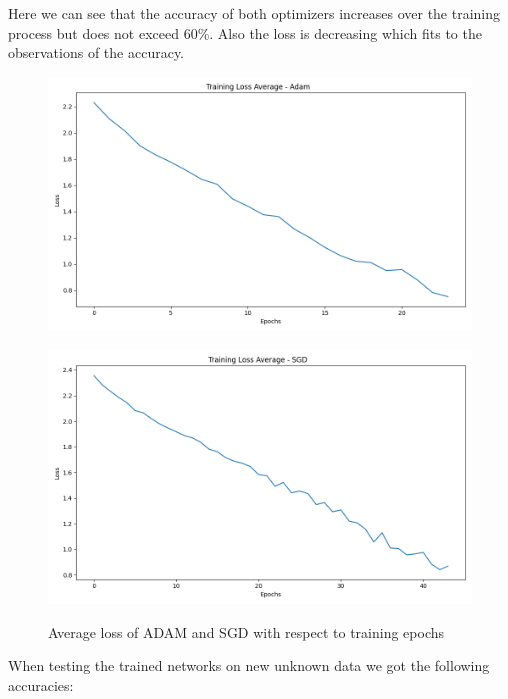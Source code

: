 \documentclass{tubaf-article}
\begin{document}
	Here we can see that the accuracy of both optimizers increases over the training process but does not exceed 60\%. Also the loss is decreasing which fits to the observations of the accuracy.

	\begin{figure}[h!]
		\centering
		\begin{minipage}{0.45\textwidth}
			\centering
			\includegraphics[width=\linewidth]{training_loss_Adam_avg.png}
			\label{fig:bild1}
		\end{minipage} \hfill
		\begin{minipage}{0.45\textwidth}
			\centering
			\includegraphics[width=\linewidth]{training_loss_sgd_avg.png}
			\label{fig:bild2}
		\end{minipage}
		\caption{Average loss of ADAM and SGD with respect to training epochs}
		\label{fig:zwei_bilder}
	\end{figure}

	When testing the trained networks on new unknown data we got the following accuracies:
	
\end{document}
